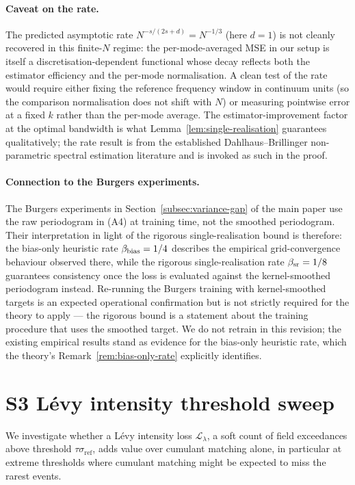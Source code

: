 \documentclass[review,12pt]{elsarticle}
\begin{document}
\paragraph{Caveat on the rate.}
The predicted asymptotic rate
$N^{-s/(2s+d)} = N^{-1/3}$ (here $d = 1$) is not cleanly recovered in
this finite-$N$ regime: the per-mode-averaged MSE in our setup is
itself a discretisation-dependent functional whose decay reflects both
the estimator efficiency and the per-mode normalisation. A clean test
of the rate would require either fixing the reference frequency
window in continuum units (so the comparison normalisation does not
shift with $N$) or measuring pointwise error at a fixed $k$ rather
than the per-mode average. The estimator-improvement factor at the
optimal bandwidth is what
Lemma~\ref{lem:single-realisation} guarantees qualitatively; the
rate result is from the established
Dahlhaus--Brillinger non-parametric spectral estimation literature
\cite{Dahlhaus1996,Brillinger1981} and is invoked as such in the proof.

\paragraph{Connection to the Burgers experiments.}
The Burgers experiments in Section~\ref{subsec:variance-gap} of the
main paper use the raw periodogram in (A4) at training time, not the
smoothed periodogram. Their interpretation in light of the rigorous
single-realisation bound is therefore: the bias-only heuristic rate
$\beta_{\rm bias} = 1/4$ describes the empirical grid-convergence
behaviour observed there, while the rigorous single-realisation rate
$\beta_{\rm sr} = 1/8$ guarantees consistency once the loss is
evaluated against the kernel-smoothed periodogram instead.
Re-running the Burgers training with kernel-smoothed targets is an
expected operational confirmation but is not strictly required for
the theory to apply --- the rigorous bound is a statement about the
training procedure that uses the smoothed target. We do not retrain
in this revision; the existing empirical results stand as evidence
for the bias-only heuristic rate, which the theory's
Remark~\ref{rem:bias-only-rate} explicitly identifies.

\section*{S3 \quad L\'evy intensity threshold sweep}
\label{app:levy-tau}

We investigate whether a L\'evy intensity loss
\(\mathcal{L}_{\lambda}\), a soft count of field exceedances
above threshold \(\tau\sigma_{\mathrm{ref}}\), adds value
over cumulant matching alone, in particular at extreme thresholds
where cumulant matching might be expected to miss the rarest
events.
\end{document}
